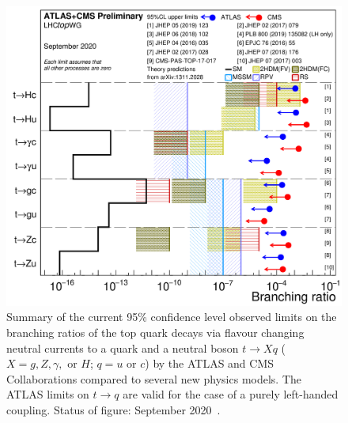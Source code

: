\begin{figure}[htb]
	\centering
	\includegraphics[scale=0.15]{Chapters/CH5/figures/fcnc_summarybsm}
	\caption{Summary of the current 95\% confidence level observed limits on the branching ratios of the top quark decays via flavour changing neutral currents to a quark and a neutral boson $t\rightarrow Xq$ ($X = g, Z, \gamma,$ or $H$; $q = u$ or $c$) by the ATLAS and CMS Collaborations compared to several new physics models. The ATLAS limits on $t \rightarrow q$ are valid for the case of a purely left-handed coupling. Status of figure: September 2020~\cite{lim_2020}.}
	\label{fig:intro:limits}
\end{figure}

